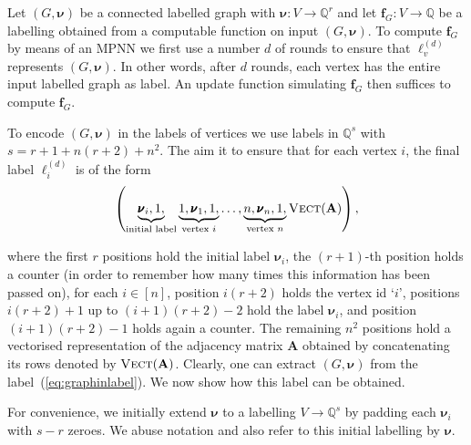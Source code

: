 \begin{example}
	Let $( G,\pmb{\nu})$ be a connected labelled graph with $\pmb{\nu}:V\to\mathbb{Q}^r$ and let $\mathbf{f}_G:V\to\mathbb{Q}$ be a labelling 
	obtained from a computable function on input 	$( G,\pmb{\nu})$. To compute $\mathbf{f}_G$ by means of an MPNN we first use a number $d$ of rounds to ensure that $\pmb{\ell}^{(d)}_v$ represents $( G,\pmb{\nu})$. In other words, after $d$ rounds, each vertex has the entire input labelled graph as label. An update function simulating $\mathbf{f}_G$ then suffices to compute $\mathbf{f}_G$.
	
To encode $( G,\pmb{\nu})$ in the labels of vertices we use labels in $\mathbb{Q}^s$ with 
$s=r+1+n(r+2)+n^2$. The aim it to ensure that for each vertex $i$, the final label $\pmb{\ell}_i^{(d)}$ is of the form
\begin{equation}
\left(\underbrace{\pmb{\nu}_i,1,}_{\text{initial label}}\underbrace{1,\pmb{\nu}_1,1,}_{\text{vertex $i$}}\ldots,\underbrace{n,\pmb{\nu}_n,1,}_{\text{vertex $n$}}\textsc{Vect}(\mathbf{A})\right), \label{eq:graphinlabel}
\end{equation}

where the first $r$ positions hold the initial label $\pmb{\nu}_i$,
the $(r+1)$-th position holds a counter (in order to remember how many times
this information has been passed on), for each $i\in[n]$, position
$i(r+2)$ holds the vertex id `$i$', positions $i(r+2)+1$ up to $(i+1)(r+2)-2$
hold the label $\pmb{\nu}_i$, and position $(i+1)(r+2)-1$ holds again a counter.
The remaining $n^2$ positions hold a vectorised representation of the adjacency matrix $\mathbf{A}$ obtained by concatenating its rows denoted by $\textsc{Vect}(\mathbf{A})$. Clearly, one can extract 
$(G,\pmb{\nu})$ from the label~(\ref{eq:graphinlabel}). We now show how this label can be obtained.

For convenience, we initially extend $\pmb{\nu}$
to a labelling $V\to\mathbb{Q}^s$ by padding each $\pmb{\nu}_i$ with $s-r$ zeroes. We abuse notation and also refer to this initial labelling by $\pmb{\nu}$.


\end{example}
